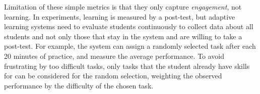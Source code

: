 Limitation of these simple metrics is that they only capture \emph{engagement},
not learning.
In experiments, learning is measured by a %
post-test,
but adaptive learning systems need to evaluate students continuously to collect data about
all students and not only those that stay in the system and are willing
to take a post-test.
For example, the system can assign a randomly selected task after each 20 minutes of practice,
and measure the average performance.
To avoid frustrating by too difficult tasks, only tasks that the student already have
skills for can be considered for the random selection,
weighting the observed performance by the difficulty of the chosen task.


%


